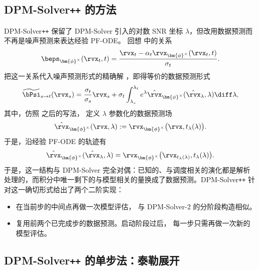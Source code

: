 \subsection{DPM-Solver\texttt{++} 的方法}

DPM-Solver\texttt{++} 保留了 DPM-Solver 引入的对数 SNR 坐标
$\lambda$，但改用数据预测而不再是噪声预测来表达经验 PF-ODE。
回想  中的关系
\[
\beps_{\bm{\phi}^\times}(\rvx_t,t)
=
\frac{
\rvx_t-\alpha_t\rvx_{\bm{\phi}^\times}(\rvx_t,t)
}{
\sigma_t
}.
\]
把这一关系代入噪声预测形式的精确解
，即得等价的数据预测形式
\begin{equation}
\label{eq:dpmpp-data-exact}
\widetilde\bPsi_{s\to t}(\rvx_s)
=
\frac{\sigma_t}{\sigma_s}\rvx_s
+
\sigma_t
\int_{\lambda_s}^{\lambda_t}
e^\lambda
\hat{\rvx}_{\bm{\phi}^\times}
(\hat\rvx_\lambda,\lambda)
\diff\lambda,
\end{equation}
其中，仿照  之后的写法，
定义 $\lambda$ 参数化的数据预测场
\[
\hat{\rvx}_{\bm{\phi}^\times}
(\rvx,\lambda)
:=
\rvx_{\bm{\phi}^\times}
\bigl(
\rvx,
t_\lambda(\lambda)
\bigr).
\]
于是，沿经验 PF-ODE 的轨迹有
\[
\hat{\rvx}_{\bm{\phi}^\times}
(\hat\rvx_\lambda,\lambda)
=
\rvx_{\bm{\phi}^\times}
\bigl(
\rvx_{t_\lambda(\lambda)},
t_\lambda(\lambda)
\bigr).
\]
于是，这一结构与 DPM-Solver 完全对偶：已知的、与调度相关的演化都是解析处理的，而积分中唯一剩下的与模型相关的量换成了数据预测。DPM-Solver\texttt{++} 针对这一确切形式给出了两个二阶实现：

\begin{itemize}
    \item {}
    在当前步的中间点再做一次模型评估，
    与 DPM-Solver-2 的分阶段构造相似。

    \item {}
    复用前两个已完成步的数据预测。启动阶段过后，
    每一步只需再做一次新的模型评估。
\end{itemize}


\subsection{DPM-Solver\texttt{++} 的单步法：泰勒展开}
\label{subsec:dpm-solver++-single}

